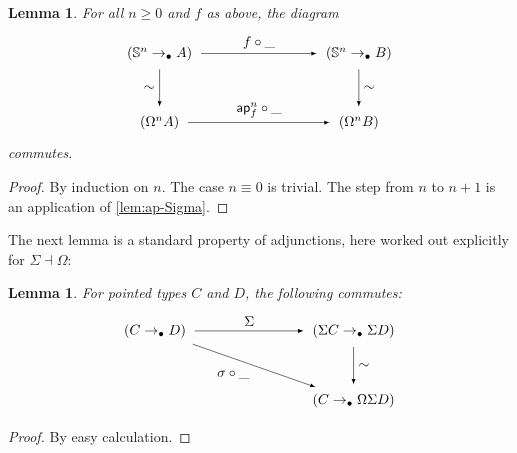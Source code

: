 \documentclass[11pt,a4paper,oneside,reqno]{amsart}
\newtheorem{lemma}[theorem]{Lemma}
\theoremstyle{definition}
\theoremstyle{remark}
\newcommand{\sph}[1]{{\mathbb S}^{#1}}
\newcommand{\pointedm}{\rightarrow_\bullet}
\begin{document}
\begin{lemma}\label{lem:iterated-ap-Sigma}
 For all $n \geq 0$ and $f$ as above, the diagram
\begin{equation}
\begin{tikzpicture}[x=5cm,y=-1.75cm,baseline=(current bounding box.center)]
 \tikzset{arrow/.style={shorten >=0.1cm,shorten <=.1cm,-latex}}
 \node (A) at (0,0) {$(\sph n \pointedm A)$}; 
 \node (D) at (1,0) {$(\sph n \pointedm B)$}; 
 \node (B) at (0,1) {$(\Omega^n A)$}; 
 \node (C) at (1,1) {$(\Omega^n B)$}; 

 \draw[arrow] (A) to node [above] {$f \circ \_$} (D);
 \draw[arrow] (A) to node [left] {$\sim$} (B);
 \draw[arrow] (B) to node [above] {$\mathsf{ap}_f^n \circ \_$} (C);
 \draw[arrow] (D) to node [right] {$\sim$} (C);
\end{tikzpicture}
\end{equation}
 commutes.
\end{lemma}
\begin{proof}
 By induction on $n$. The case $n \equiv 0$ is trivial.
 The step from $n$ to $n+1$ is an application of \cref{lem:ap-Sigma}.
\end{proof}

The next lemma is a standard property of adjunctions, here worked out explicitly for $\Sigma \dashv \Omega$:
\begin{lemma} \label{lem:adj-prop}
 For pointed types $C$ and $D$, the following commutes:
\begin{equation}
\begin{tikzpicture}[x=5cm,y=-1.75cm,baseline=(current bounding box.center)]
 \tikzset{arrow/.style={shorten >=0.1cm,shorten <=.1cm,-latex}}
 \node (A) at (0,0) {$(C \pointedm D)$}; 
 \node (D) at (1,0) {$(\Sigma C \pointedm \Sigma D)$}; 
 \node (C) at (1,1) {$(C \pointedm \Omega \Sigma D)$}; 

 \draw[arrow] (A) to node [above] {$\Sigma$} (D);
 \draw[arrow] (A) to node [below left] {$\sigma \circ \_$} (C);
 \draw[arrow] (D) to node [right] {$\sim$} (C);
\end{tikzpicture}
\end{equation}
\end{lemma}
\begin{proof}
 By easy calculation.
\end{proof}
\end{document}
